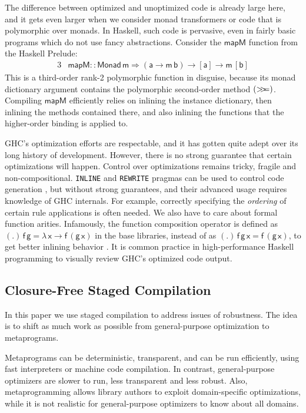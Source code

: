 \documentclass[acmsmall]{acmart}
\newcommand{\msf}[1]{{\mathsf{#1}}}
\newcommand{\lam}{\lambda\,}
\newcommand{\vm}{\mathsf{m}}
\newcommand{\va}{\mathsf{a}}
\newcommand{\vb}{\mathsf{b}}
\newcommand{\vx}{\mathsf{x}}
\newcommand{\vf}{\mathsf{f}}
\newcommand{\vg}{\mathsf{g}}
\newcommand{\Monad}{\msf{Monad}}
\newcommand{\bind}{\mathbin{>\!\!>\mkern-6.7mu=}}
\theoremstyle{remark}
\begin{document}
The difference between optimized and unoptimized code is already large here, and
it gets even larger when we consider monad transformers or code that is
polymorphic over monads. In Haskell, such code is pervasive, even in fairly
basic programs which do not use fancy abstractions. Consider the $\msf{mapM}$
function from the Haskell Prelude:
\begin{alignat*}{3}
  & \msf{mapM} :: \Monad\,\vm \Rightarrow (\va \to \vm\,\vb) \to [\va] \to \vm\,[\vb]
\end{alignat*}
This is a third-order rank-2 polymorphic function in disguise, because
its monad dictionary argument contains the polymorphic second-order method
$(\bind)$.  Compiling $\msf{mapM}$ efficiently relies on inlining the instance
dictionary, then inlining the methods contained there, and also inlining the
functions that the higher-order binding is applied to.

GHC's optimization efforts are respectable, and it has gotten quite adept over
its long history of development. However, there is no strong guarantee that
certain optimizations will happen. Control over optimizations remains tricky,
fragile and non-compositional. \texttt{INLINE} and \texttt{REWRITE} pragmas can
be used to control code generation \cite{ghcdocs}, but without strong
guarantees, and their advanced usage requires knowledge of GHC internals. For
example, correctly specifying the \emph{ordering} of certain rule applications
is often needed. We also have to care about formal function arities. Infamously,
the function composition operator is defined as $(.)\,\vf\,\vg = \lam \vx \to
\vf\,(\vg\,\vx)$ in the base libraries, instead of as $(.)\,\vf\,\vg\,\vx =
\vf\,(\vg\,\vx)$, to get better inlining behavior \cite{ghcbase}. It is common
practice in high-performance Haskell programming to visually review GHC's
optimized code output.

\subsection{Closure-Free Staged Compilation}

In this paper we use staged compilation to address issues of robustness. The
idea is to shift as much work as possible from general-purpose optimization to
metaprograms.

Metaprograms can be deterministic, transparent, and can be run efficiently,
using fast interpreters or machine code compilation. In contrast,
general-purpose optimizers are slower to run, less transparent and less
robust. Also, metaprogramming allows library authors to exploit
domain-specific optimizations, while it is not realistic for general-purpose
optimizers to know about all domains.
\end{document}
